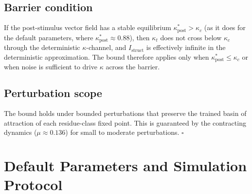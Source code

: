 \documentclass[12pt,a4paper]{article}
\begin{document}
\subsection{Barrier condition}
If the post-stimulus vector field has a stable equilibrium $\kappa^*_{\mathrm{post}} > \kappa_c$ (as it does for the default parameters, where $\kappa^*_{\mathrm{post}} \approx 0.88$), then $\kappa_t$ does not cross below $\kappa_c$ through the deterministic $\kappa$-channel, and $I_{\mathrm{struct}}$ is effectively infinite in the deterministic approximation. The bound therefore applies only when $\kappa^*_{\mathrm{post}} \leq \kappa_c$ or when noise is sufficient to drive $\kappa$ across the barrier.

\subsection{Perturbation scope}
The bound holds under bounded perturbations that preserve the trained basin of attraction of each residue-class fixed point. This is guaranteed by the contracting dynamics ($\mu \approx 0.136$) for small to moderate perturbations. $\square$


\section{Default Parameters and Simulation Protocol}
\label{sec:params}
\end{document}

